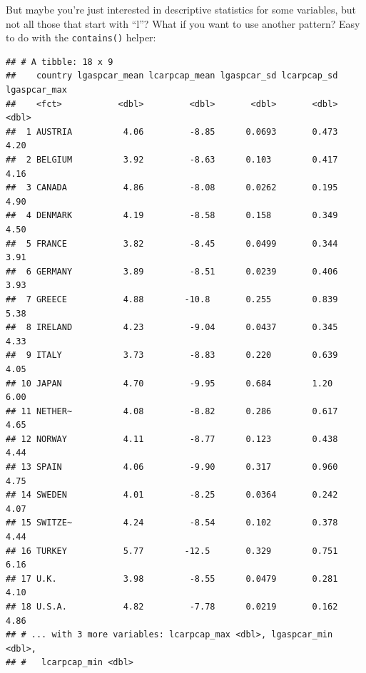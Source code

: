 \documentclass[]{gitbook}
\newenvironment{Shaded}{\begin{snugshade}}{\end{snugshade}}
\newcommand{\KeywordTok}[1]{\textcolor[rgb]{0.13,0.29,0.53}{\textbf{#1}}}
\newcommand{\NormalTok}[1]{#1}
\newcommand{\OperatorTok}[1]{\textcolor[rgb]{0.81,0.36,0.00}{\textbf{#1}}}
\newcommand{\StringTok}[1]{\textcolor[rgb]{0.31,0.60,0.02}{#1}}
\theoremstyle{definition}
\theoremstyle{definition}
\theoremstyle{definition}
\theoremstyle{remark}
\begin{document}
But maybe you're just interested in descriptive statistics for some
variables, but not all those that start with ``l''? What if you want to
use another pattern? Easy to do with the \texttt{contains()} helper:

\begin{Shaded}
\end{Shaded}

\begin{verbatim}
## # A tibble: 18 x 9
##    country lgaspcar_mean lcarpcap_mean lgaspcar_sd lcarpcap_sd lgaspcar_max
##    <fct>           <dbl>         <dbl>       <dbl>       <dbl>        <dbl>
##  1 AUSTRIA          4.06         -8.85      0.0693       0.473         4.20
##  2 BELGIUM          3.92         -8.63      0.103        0.417         4.16
##  3 CANADA           4.86         -8.08      0.0262       0.195         4.90
##  4 DENMARK          4.19         -8.58      0.158        0.349         4.50
##  5 FRANCE           3.82         -8.45      0.0499       0.344         3.91
##  6 GERMANY          3.89         -8.51      0.0239       0.406         3.93
##  7 GREECE           4.88        -10.8       0.255        0.839         5.38
##  8 IRELAND          4.23         -9.04      0.0437       0.345         4.33
##  9 ITALY            3.73         -8.83      0.220        0.639         4.05
## 10 JAPAN            4.70         -9.95      0.684        1.20          6.00
## 11 NETHER~          4.08         -8.82      0.286        0.617         4.65
## 12 NORWAY           4.11         -8.77      0.123        0.438         4.44
## 13 SPAIN            4.06         -9.90      0.317        0.960         4.75
## 14 SWEDEN           4.01         -8.25      0.0364       0.242         4.07
## 15 SWITZE~          4.24         -8.54      0.102        0.378         4.44
## 16 TURKEY           5.77        -12.5       0.329        0.751         6.16
## 17 U.K.             3.98         -8.55      0.0479       0.281         4.10
## 18 U.S.A.           4.82         -7.78      0.0219       0.162         4.86
## # ... with 3 more variables: lcarpcap_max <dbl>, lgaspcar_min <dbl>,
## #   lcarpcap_min <dbl>
\end{verbatim}
\end{document}
